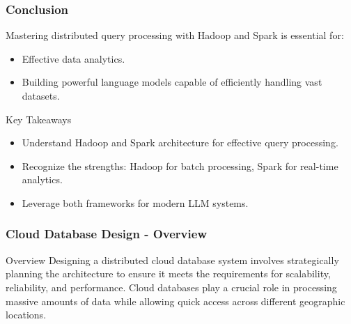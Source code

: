 \documentclass[aspectratio=169]{beamer}
\begin{document}
\begin{frame}[fragile]
    \frametitle{Conclusion}
    Mastering distributed query processing with Hadoop and Spark is essential for:
    \begin{itemize}
        \item Effective data analytics.
        \item Building powerful language models capable of efficiently handling vast datasets.
    \end{itemize}
    \begin{block}{Key Takeaways}
        \begin{itemize}
            \item Understand Hadoop and Spark architecture for effective query processing.
            \item Recognize the strengths: Hadoop for batch processing, Spark for real-time analytics.
            \item Leverage both frameworks for modern LLM systems.
        \end{itemize}
    \end{block}
\end{frame}

\begin{frame}[fragile]
    \frametitle{Cloud Database Design - Overview}
    \begin{block}{Overview}
        Designing a distributed cloud database system involves strategically planning the architecture to ensure it meets the requirements for scalability, reliability, and performance. Cloud databases play a crucial role in processing massive amounts of data while allowing quick access across different geographic locations.
    \end{block}
\end{frame}
\end{document}
